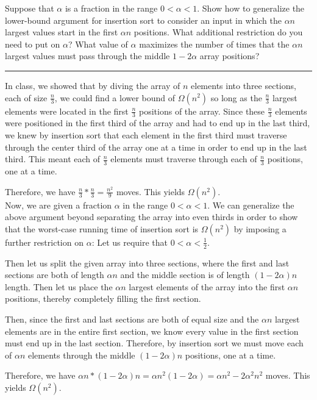 \documentclass[11pt]{article}
\def\separateline{\medskip\hrule\medskip}
\begin{document}
Suppose that $\alpha$ is a fraction in the range $0 < \alpha < 1$. Show how to generalize the lower-bound argument for insertion sort to consider an input in which the $\alpha n$ largest values start in the first $\alpha n$ positions. What additional restriction do you need to put on $\alpha$? What value of $\alpha$ maximizes the number of times that the $\alpha n$ largest values must pass through the middle $1 - 2\alpha$ array positions?
\separateline

In class, we showed that by diving the array of $n$ elements into three sections, each of size $\frac{n}{3}$, we could find a lower bound of $\Omega(n^2)$ so long as the $\frac{n}{3}$ largest elements were located in the first $\frac{n}{3}$ positions of the array. Since these $\frac{n}{3}$ elements were positioned in the first third of the array and had to end up in the last third, we knew by insertion sort that each element in the first third must traverse through the center third of the array one at a time in order to end up in the last third. This meant each of $\frac{n}{3}$ elements must traverse through each of $\frac{n}{3}$ positions, one at a time.

Therefore, we have $\frac{n}{3} * \frac{n}{3} = \frac{n^2}{9}$ moves. This yields $\Omega(n^2)$.\\

Now, we are given a fraction $\alpha$ in the range $0 < \alpha < 1$. We can generalize the above argument beyond separating the array into even thirds in order to show that the worst-case running time of insertion sort is $\Omega(n^2)$ by imposing a further restriction on $\alpha$: Let us require that $0 < \alpha < \frac{1}{2}$.

Then let us split the given array into three sections, where the first and last sections are both of length $\alpha n$ and the middle section is of length $(1 - 2\alpha)n$ length. Then let us place the $\alpha n$ largest elements of the array into the first $\alpha n$ positions, thereby completely filling the first section.

Then, since the first and last sections are both of equal size and the $\alpha n$ largest elements are in the entire first section, we know every value in the first section must end up in the last section. Therefore, by insertion sort we must move each of $\alpha n$ elements through the middle $(1 - 2\alpha)n$ positions, one at a time.

Therefore, we have $\alpha n * (1 - 2\alpha)n = \alpha n^2(1 - 2\alpha) = \alpha n^2 - 2\alpha^2 n^2$ moves. This yields $\Omega(n^2)$.\\
\end{document}
